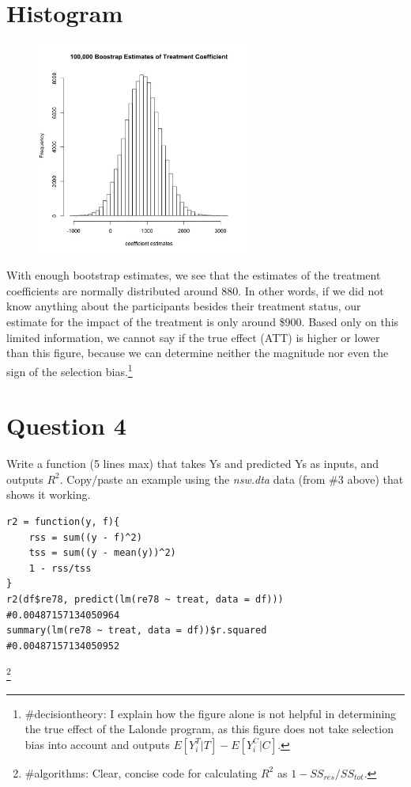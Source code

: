 \documentclass[11pt, oneside]{article}
\begin{document}
\section*{Histogram}
\begin{figure}[h]
	\includegraphics[width = 7cm, height = 7cm]{coefestimates.jpg}
\end{figure}
With enough bootstrap estimates, we see that the estimates of the treatment coefficients are normally distributed around 880. In other words, if we did not know anything about the participants besides their treatment status, our estimate for the impact of the treatment is only around \$900. Based only on this limited information, we cannot say if the true effect (ATT) is higher or lower than this figure, because we can determine neither the magnitude nor even the sign of the selection bias.\footnote{\#decisiontheory: I explain how the figure alone is not helpful in determining the true effect of the Lalonde program, as this figure does not take selection bias into account and outputs $E[Y^T_i|T] - E[Y^C_i|C]$.}

\section*{Question 4}
Write a function (5 lines max) that takes Ys and predicted Ys as inputs, and outputs $R^2$. Copy/paste an example using the \textit{nsw.dta} data (from \#3 above) that shows it working.
\begin{verbatim}
r2 = function(y, f){
    rss = sum((y - f)^2)
    tss = sum((y - mean(y))^2)
    1 - rss/tss
}
r2(df$re78, predict(lm(re78 ~ treat, data = df)))	 #0.00487157134050964
summary(lm(re78 ~ treat, data = df))$r.squared		    #0.00487157134050952
\end{verbatim}\footnote{\#algorithms: Clear, concise code for calculating $R^2$ as $1 - SS_{res}/SS_{tot}$.}
\end{document}
